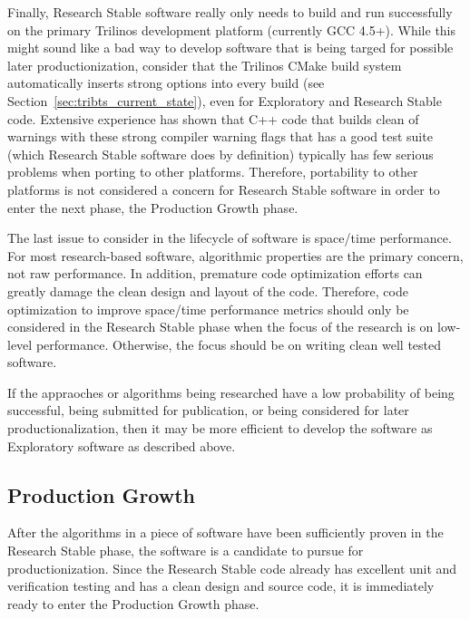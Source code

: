 \documentclass[11pt]{SANDreport}
\begin{document}
Finally, Research Stable software really only needs to build and run
successfully on the primary Trilinos development platform (currently
GCC 4.5+).  While this might sound like a bad way to develop software
that is being targed for possible later productionization, consider
that the Trilinos CMake build system automatically inserts strong
options into every build (see
Section~\ref{sec:tribts_current_state}), even for Exploratory and
Research Stable code.  Extensive experience has shown that C++ code
that builds clean of warnings with these strong compiler warning flags
that has a good test suite (which Research Stable software does by
definition) typically has few serious problems when porting to other
platforms.  Therefore, portability to other platforms is not
considered a concern for Research Stable software in order to enter
the next phase, the Production Growth phase.

The last issue to consider in the lifecycle of software is space/time
performance.  For most research-based software, algorithmic properties
are the primary concern, not raw performance.  In addition, premature
code optimization efforts can greatly damage the clean design and
layout of the code.  Therefore, code optimization to improve
space/time performance metrics should only be considered in the
Research Stable phase when the focus of the research is on low-level
performance.  Otherwise, the focus should be on writing clean well
tested software.

If the appraoches or algorithms being researched have a low
probability of being successful, being submitted for publication, or
being considered for later productionalization, then it may be more
efficient to develop the software as Exploratory software as described
above.


%
{}\subsection{Production Growth}
%

After the algorithms in a piece of software have been sufficiently
proven in the Research Stable phase, the software is a candidate to
pursue for productionization.  Since the Research Stable code already
has excellent unit and verification testing and has a clean design and
source code, it is immediately ready to enter the Production Growth
phase.
\end{document}
